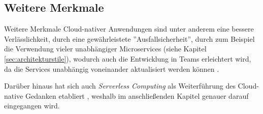\subsection{Weitere Merkmale}
Weitere Merkmale Cloud-nativer Anwendungen sind unter anderem eine bessere Verlässlichkeit, durch eine gewährleistete ''Ausfallsicherheit'', durch zum Beispiel die Verwendung vieler unabhängiger Microservices (siehe Kapitel \ref{sec:architekturstile}), wodurch auch die Entwicklung in Teams erleichtert wird, da die Services unabhängig voneinander aktualisiert werden können \cite[Vgl.][]{VMwareb}.

Darüber hinaus hat sich auch \textit{Serverless Computing} als Weiterführung des Cloud-native Gedanken etabliert \cite[Vgl.][S. 1]{CNCF2018}, weshalb im anschließenden Kapitel genauer darauf eingegangen wird. \pagebreak